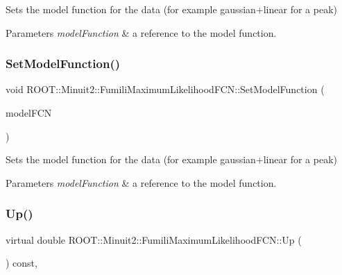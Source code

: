 Sets the model function for the data (for example gaussian+linear for a peak)


\begin{DoxyParams}{Parameters}
{\em model\+Function} & a reference to the model function. \\
\hline
\end{DoxyParams}
\mbox{\label{classROOT_1_1Minuit2_1_1FumiliMaximumLikelihoodFCN_a1aef27a37fc3a8df63aed6aff19c0c33}} 
\subsubsection{\texorpdfstring{SetModelFunction()}{SetModelFunction()}\hspace{0.1cm}{\footnotesize\ttfamily [3/3]}}
{\footnotesize\ttfamily void R\+O\+O\+T\+::\+Minuit2\+::\+Fumili\+Maximum\+Likelihood\+F\+C\+N\+::\+Set\+Model\+Function (\begin{DoxyParamCaption}\item[{const \mbox{\hyperlink{classROOT_1_1Minuit2_1_1ParametricFunction}{Parametric\+Function}} \&}]{model\+F\+CN }\end{DoxyParamCaption})\hspace{0.3cm}{\ttfamily [inline]}}

Sets the model function for the data (for example gaussian+linear for a peak)


\begin{DoxyParams}{Parameters}
{\em model\+Function} & a reference to the model function. \\
\hline
\end{DoxyParams}
\mbox{\label{classROOT_1_1Minuit2_1_1FumiliMaximumLikelihoodFCN_ab945da701895bfba143da08f76ba2d05}} 
\subsubsection{\texorpdfstring{Up()}{Up()}\hspace{0.1cm}{\footnotesize\ttfamily [1/3]}}
{\footnotesize\ttfamily virtual double R\+O\+O\+T\+::\+Minuit2\+::\+Fumili\+Maximum\+Likelihood\+F\+C\+N\+::\+Up (\begin{DoxyParamCaption}{ }\end{DoxyParamCaption}) const\hspace{0.3cm}{\ttfamily [inline]}, {\ttfamily [virtual]}}

